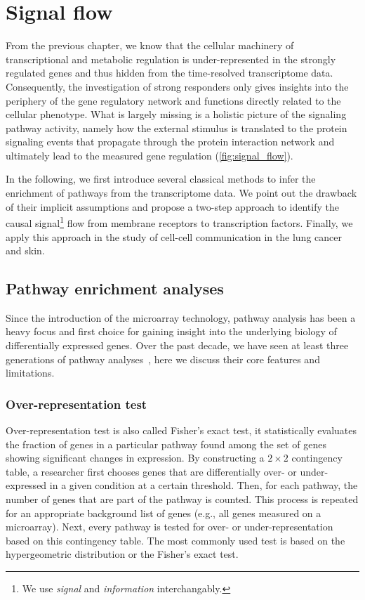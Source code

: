 \chapter{Signal flow}
\label{chap:flow}

From the previous chapter, we know that the cellular machinery of 
transcriptional and metabolic regulation is under-represented in the strongly 
regulated genes and thus hidden from the time-resolved transcriptome data. 
Consequently, the investigation of strong responders only gives insights into
the periphery of the gene regulatory network and functions directly related
to the cellular phenotype. What is largely missing is a holistic picture of
the signaling pathway activity, namely how the external stimulus is translated
to the protein signaling events that propagate through the protein interaction
network and ultimately lead to the measured gene regulation (\ref{fig:signal_flow}).

In the following, we first introduce several classical methods to infer the
enrichment of pathways from the transcriptome data. We point out the drawback
of their implicit assumptions and propose a two-step approach to identify the
causal signal\footnote{We use \emph{signal} and \emph{information} interchangably.} 
flow from membrane receptors to transcription factors. Finally,
we apply this approach in the study of cell-cell communication in the lung
cancer and skin.

\section{Pathway enrichment analyses}
Since the introduction of the microarray technology, pathway analysis has been 
a heavy focus and first choice for gaining insight into the underlying biology 
of differentially expressed genes. Over the past decade, we have seen at least 
three generations of pathway analyses~\citep{Khatri2012}, here we discuss 
their core features and limitations.

\subsection{Over-representation test}
Over-representation test is also called Fisher's exact test, it statistically 
evaluates the fraction of genes in a particular pathway found among the set 
of genes showing significant changes in expression. By constructing a
$2 \times 2$ contingency table, a researcher first chooses genes that are 
differentially over- or under-expressed in a given condition at a certain 
threshold. Then, for each pathway, the number of genes that are part of the 
pathway is counted. This process is repeated for an appropriate background 
list of genes (e.g., all genes measured on a microarray). Next, every pathway 
is tested for over- or under-representation based on this contingency table. 
The most commonly used test is based on the hypergeometric distribution or
the Fisher's exact test.

